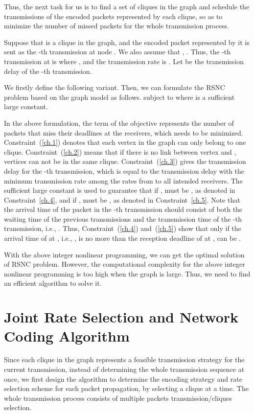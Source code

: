 \documentclass[journal]{IEEEtran}
\begin{document}
Thus, the next task for us is to find a set of cliques in the graph and schedule the transmissions of the encoded packets represented by each clique, so as to minimize the number of missed packets for the whole transmission process.

Suppose that  is a clique in the graph, and the encoded packet represented by it is sent as the -th transmission at node . We also assume that , . Thus, the -th transmission at  is  where , and the transmission rate is . Let  be the transmission delay of the -th transmission.

We firstly define the following variant.
{\small }
Then, we can formulate the RSNC problem based on the graph model as follows.
{\small }
subject to{\small }\vspace{-0.04in}
where  is a sufficient large constant.

In the above formulation, the term of the objective represents the number of packets that miss their deadlines at the receivers, which needs to be minimized.
Constraint~(\ref{ch.1}) denotes that each vertex in the graph can only belong to one clique. Constraint~(\ref{ch.2}) means that if there is no link between vertex  and , vertices  can not be in the same clique. Constraint~(\ref{ch.3}) gives the transmission delay for the -th transmission, which is equal to the transmission delay with the minimum transmission rate among the rates from  to all intended receivers. The sufficient large constant  is used to guarantee that if ,  must be , as denoted in Constraint~\ref{ch.4}, and if ,  must be , as denoted in Constraint~\ref{ch.5}. Note that the arrival time of the packet in the -th transmission should consist of both the waiting time of the previous  transmissions and the transmission time of the -th transmission, i.e., .
Thus, Constraint~(\ref{ch.4}) and~(\ref{ch.5}) show that only if the arrival time of  at , i.e., , is no more than the reception deadline of  at ,  can be .

With the above integer nonlinear programming, we can get the optimal solution of RSNC problem. However, the computational complexity for the above integer nonlinear programming is too high when the graph is large. Thus, we need to find an efficient algorithm to solve it.

\vspace{-0.04in}
\section{Joint Rate Selection and Network Coding Algorithm}\label{Sec.algorithm}\vspace{-0.03in}
Since each clique in the graph represents a feasible transmission strategy for the current transmission, instead of determining the whole transmission sequence at once, we first design the algorithm to determine the encoding strategy and rate selection scheme for each packet propagation, by selecting a clique at a time. The whole transmission process consists of multiple packets transmission/cliques selection.
\vspace{-0.07in}
\end{document}
